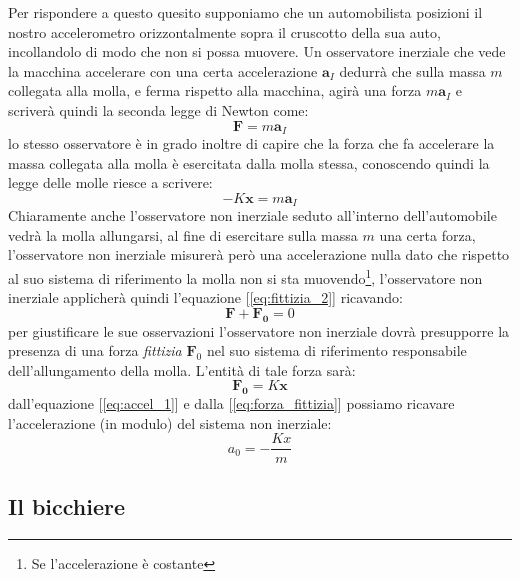 \documentclass[a4paper,10pt,oneside]{article}
\begin{document}
Per rispondere a questo quesito supponiamo che un automobilista posizioni il nostro accelerometro orizzontalmente sopra il cruscotto della sua auto, incollandolo di modo che non si possa muovere. Un osservatore inerziale che vede la macchina accelerare con una certa accelerazione $\mathbf{a}_I$ dedurrà che sulla massa $m$ collegata alla molla, e ferma rispetto alla macchina, agirà una forza $m\mathbf{a}_I$ e scriverà quindi la seconda legge di Newton come:
\begin{equation}
 \mathbf{F}=m\mathbf{a}_I
\end{equation}
lo stesso osservatore è in grado inoltre di capire che la forza che fa accelerare la massa collegata alla molla è esercitata dalla molla stessa, conoscendo quindi la legge delle molle riesce a scrivere:
\begin{equation}
 -K\mathbf{x}=m\mathbf{a}_I
\end{equation}
Chiaramente anche l'osservatore non inerziale seduto all'interno dell'automobile vedrà la molla allungarsi, al fine di esercitare sulla massa $m$ una certa forza, l'osservatore non inerziale misurerà però una accelerazione nulla dato che rispetto al suo sistema di riferimento la molla non si sta muovendo\footnote{Se l'accelerazione è costante}, l'osservatore non inerziale applicherà quindi l'equazione [\ref{eq:fittizia_2}] ricavando:
\begin{equation}
 \mathbf{F}+\mathbf{F_0}=0
\end{equation}
per giustificare le sue osservazioni l'osservatore non inerziale dovrà presupporre la presenza di una forza \emph{fittizia} $\mathbf{F}_0$ nel suo sistema di riferimento responsabile dell'allungamento della molla.
L'entità di tale forza sarà:
\begin{equation}\label{eq:accel_1}
 \mathbf{F_0}=K\mathbf{x}
\end{equation}
dall'equazione [\ref{eq:accel_1}] e dalla [\ref{eq:forza_fittizia}] possiamo ricavare l'accelerazione (in modulo) del sistema non inerziale:
\begin{equation}\label{eq:accel_2}
a_0=-\frac{Kx}{m}
\end{equation}


\subsection*{Il bicchiere}
\end{document}
